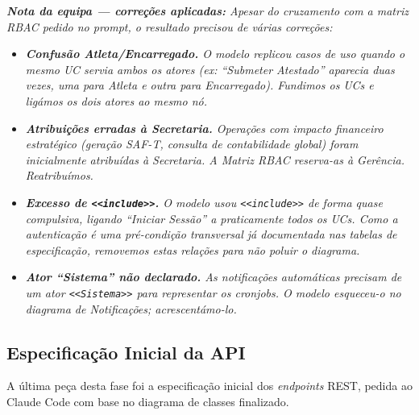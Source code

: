 \noindent\textit{\textbf{Nota da equipa --- correções aplicadas:} Apesar do cruzamento com a matriz RBAC pedido no \textit{prompt}, o resultado precisou de várias correções:}
\begin{itemize}
    \item \textit{\textbf{Confusão Atleta/Encarregado.} O modelo replicou casos de uso quando o mesmo UC servia ambos os atores (ex: ``Submeter Atestado'' aparecia duas vezes, uma para Atleta e outra para Encarregado). Fundimos os UCs e ligámos os dois atores ao mesmo nó.}
    \item \textit{\textbf{Atribuições erradas à Secretaria.} Operações com impacto financeiro estratégico (geração SAF-T, consulta de contabilidade global) foram inicialmente atribuídas à Secretaria. A Matriz RBAC reserva-as à Gerência. Reatribuímos.}
    \item \textit{\textbf{Excesso de \texttt{<<include>>}.} O modelo usou \texttt{<<include>>} de forma quase compulsiva, ligando ``Iniciar Sessão'' a praticamente todos os UCs. Como a autenticação é uma pré-condição transversal já documentada nas tabelas de especificação, removemos estas relações para não poluir o diagrama.}
    \item \textit{\textbf{Ator ``Sistema'' não declarado.} As notificações automáticas precisam de um ator \texttt{<<Sistema>>} para representar os \textit{cronjobs}. O modelo esqueceu-o no diagrama de Notificações; acrescentámo-lo.}
\end{itemize}

\subsection{Especificação Inicial da API}\label{subsec:ia_arq_api}

A última peça desta fase foi a especificação inicial dos \textit{endpoints} REST, pedida ao Claude Code com base no diagrama de classes finalizado.


